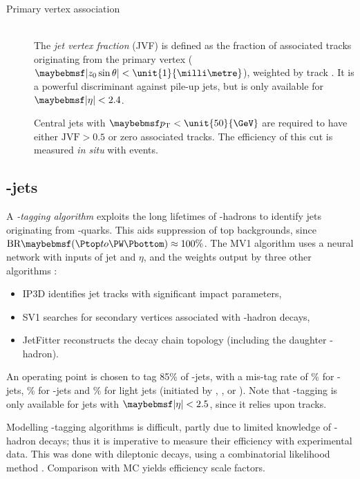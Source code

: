 \begin{description}
\item[Primary vertex association] \hfill \\
	The \textit{jet vertex fraction} (JVF) is defined as the fraction of associated tracks 
	originating from the primary vertex ($\mods{z_0 \sin\theta} < \unit{1}{\milli\metre}$), 
	weighted by track \pt \cite{Jets:PileupCorrection:2012}. It is a powerful discriminant 
	against pile-up jets, but is only available for $\mods{\eta} < 2.4$.

	Central jets with $\pt < \unit{50}{\GeV}$ are required to have either 
	$\text{JVF} > 0.5$ or zero associated tracks. The efficiency of this cut is measured 
	\textit{in situ} with \Zjets events.

\end{description}



\subsection{\Pbottom-jets}
\label{sec:objects:bjets}

A \textit{\Pbottom-tagging algorithm} exploits the long lifetimes of \Pbottom-hadrons to 
identify jets originating from \Pbottom-quarks. This aids suppression of top backgrounds, 
since $\text{BR}\parenths{\HepProcess{\Ptop \HepTo \PW\Pbottom}} \approx 100\%$. 
The MV1 algorithm uses a neural network with inputs of jet \pt and $\eta$, and the weights 
output by three other algorithms \cite{Btag:algorithms}:
\begin{itemize}[noitemsep,nolistsep]
	\item IP3D identifies jet tracks with significant impact parameters, \storeliststyle{}
	\item SV1 searches for secondary vertices associated with \Pbottom-hadron decays,
	\item JetFitter reconstructs the decay chain topology (including the daughter 
	\Pcharm-hadron).
\end{itemize}
An operating point is chosen to tag 85\% of \Pbottom-jets, with a mis-tag rate of 
\% for \Pcharm-jets, \% for \Ptau-jets and \% for light jets
(initiated by \Pup, \Pdown, \Pstrange or \Pgluon). Note that \Pbottom-tagging is only 
available for jets with $\mods{\eta} < 2.5$, since it relies upon tracks.

Modelling \Pbottom-tagging algorithms is difficult, partly due to limited knowledge of 
\Pbottom-hadron decays; thus it is imperative to measure 
their efficiency with experimental data. This was done with dileptonic \ttbar decays, 
using a combinatorial likelihood method \cite{Btag:llh}. Comparison with MC yields 
efficiency scale factors.



